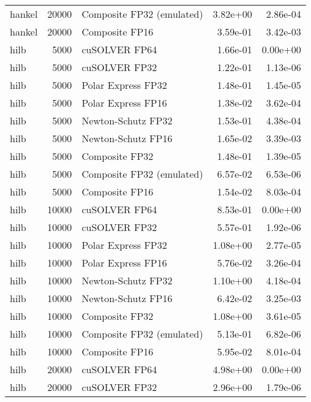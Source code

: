 \begin{table}
\begin{tabular}{lrlrr}
   hankel & 20000 & Composite FP32 (emulated) &  3.82e+00 &        2.86e-04 \\
   hankel & 20000 &            Composite FP16 &  3.59e-01 &        3.42e-03 \\
     hilb &  5000 &             cuSOLVER FP64 &  1.66e-01 &        0.00e+00 \\
     hilb &  5000 &             cuSOLVER FP32 &  1.22e-01 &        1.13e-06 \\
     hilb &  5000 &        Polar Express FP32 &  1.48e-01 &        1.45e-05 \\
     hilb &  5000 &        Polar Express FP16 &  1.38e-02 &        3.62e-04 \\
     hilb &  5000 &        Newton-Schutz FP32 &  1.53e-01 &        4.38e-04 \\
     hilb &  5000 &        Newton-Schutz FP16 &  1.65e-02 &        3.39e-03 \\
     hilb &  5000 &            Composite FP32 &  1.48e-01 &        1.39e-05 \\
     hilb &  5000 & Composite FP32 (emulated) &  6.57e-02 &        6.53e-06 \\
     hilb &  5000 &            Composite FP16 &  1.54e-02 &        8.03e-04 \\
     hilb & 10000 &             cuSOLVER FP64 &  8.53e-01 &        0.00e+00 \\
     hilb & 10000 &             cuSOLVER FP32 &  5.57e-01 &        1.92e-06 \\
     hilb & 10000 &        Polar Express FP32 &  1.08e+00 &        2.77e-05 \\
     hilb & 10000 &        Polar Express FP16 &  5.76e-02 &        3.26e-04 \\
     hilb & 10000 &        Newton-Schutz FP32 &  1.10e+00 &        4.18e-04 \\
     hilb & 10000 &        Newton-Schutz FP16 &  6.42e-02 &        3.25e-03 \\
     hilb & 10000 &            Composite FP32 &  1.08e+00 &        3.61e-05 \\
     hilb & 10000 & Composite FP32 (emulated) &  5.13e-01 &        6.82e-06 \\
     hilb & 10000 &            Composite FP16 &  5.95e-02 &        8.01e-04 \\
     hilb & 20000 &             cuSOLVER FP64 &  4.98e+00 &        0.00e+00 \\
     hilb & 20000 &             cuSOLVER FP32 &  2.96e+00 &        1.79e-06 \\

\end{tabular}
\end{table}
